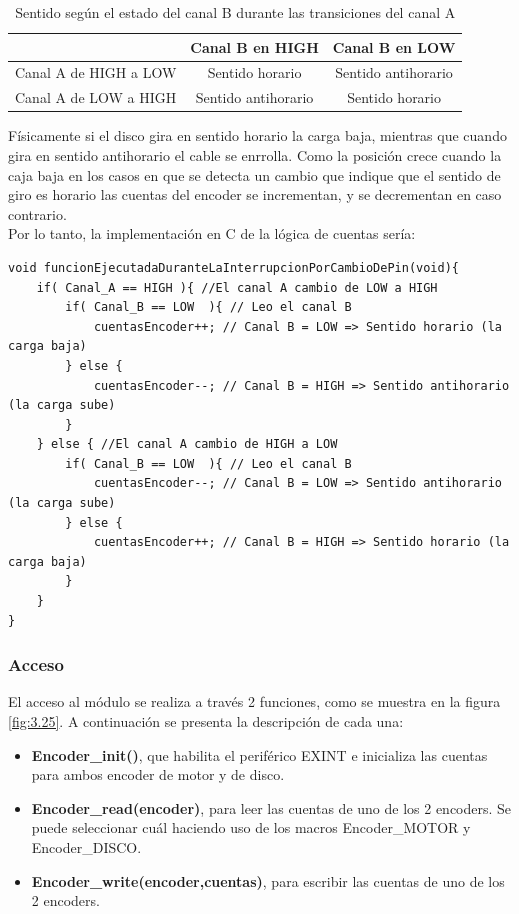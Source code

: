 \begin{table}[!ht]
	\begin{center}
		
		\begin{tabular}{|c|c|c|}
			\hline
			 & Canal B en HIGH & Canal B en LOW   \\
			\hline 
			Canal A de HIGH a LOW & Sentido horario & Sentido antihorario\\
			\hline 
			Canal A de LOW a HIGH & Sentido antihorario & Sentido horario\\
			\hline
		\end{tabular}
	\end{center}
	\caption{Sentido según el estado del canal B durante las transiciones del canal A}
	\label{table:\thetable}
\end{table}

Físicamente si el disco gira en sentido horario la carga baja, mientras que cuando gira en sentido antihorario el cable se enrrolla. Como la posición crece cuando la caja baja en los casos en que se detecta un cambio que indique que el sentido de giro es horario las cuentas del encoder se incrementan, y se decrementan en caso contrario.\\
Por lo tanto, la implementación en C de la lógica de cuentas sería:
\begin{lstlisting}[style=CStyle]
void funcionEjecutadaDuranteLaInterrupcionPorCambioDePin(void){
	if( Canal_A == HIGH ){ //El canal A cambio de LOW a HIGH
		if( Canal_B == LOW  ){ // Leo el canal B
			cuentasEncoder++; // Canal B = LOW => Sentido horario (la carga baja)
		} else {
			cuentasEncoder--; // Canal B = HIGH => Sentido antihorario (la carga sube)
		}
	} else { //El canal A cambio de HIGH a LOW
		if( Canal_B == LOW  ){ // Leo el canal B
			cuentasEncoder--; // Canal B = LOW => Sentido antihorario (la carga sube)
		} else {
			cuentasEncoder++; // Canal B = HIGH => Sentido horario (la carga baja)
		}
	}
}
\end{lstlisting}

\subsubsection{Acceso}
El acceso al módulo se realiza a través 2 funciones, como se muestra en la figura \ref{fig:3.25}. A continuación se presenta la descripción de cada una:
\begin{itemize}
	\item \textbf{Encoder\_init()}, que habilita el periférico EXINT e inicializa las cuentas para ambos encoder de motor y de disco.
	\item \textbf{Encoder\_read(encoder)}, para leer las cuentas de uno de los 2 encoders. Se puede seleccionar cuál haciendo uso de los macros Encoder\_MOTOR y Encoder\_DISCO. 
	\item \textbf{Encoder\_write(encoder,cuentas)}, para escribir las cuentas de uno de los 2 encoders.
\end{itemize}

